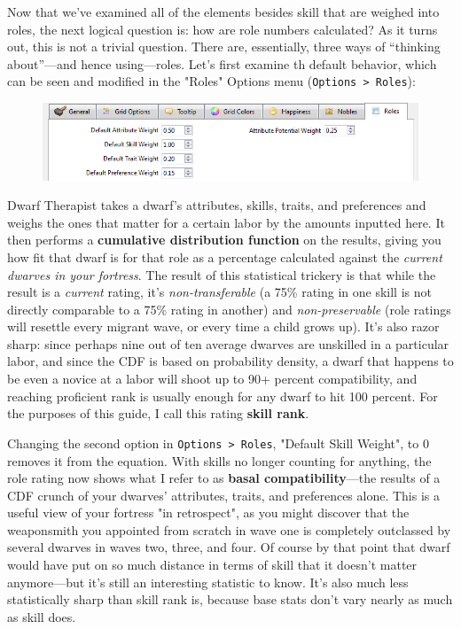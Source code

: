 \documentclass[]{article}
\begin{document}
Now that we've examined all of the elements besides skill that are weighed into roles, the next logical
question is: how are role numbers calculated? As it turns out, this is not a trivial question.
There are, essentially, three ways of ``thinking about''---and hence using---roles. Let's first examine
th default behavior, which can be seen and modified in the "Roles" Options menu (\texttt{Options >
Roles}):
\begin{figure}[h!] \centering
\vspace{-5pt}
\includegraphics[width=\linewidth]{Sec3Fig1}
\vspace{-5pt}
\end{figure}

\newpage
Dwarf Therapist takes a dwarf's attributes, skills, traits, and preferences and weighs the ones that
matter for a certain labor by the amounts inputted here. It then performs a \textbf{cumulative
distribution function} on the results, giving you how fit that dwarf is for that role as a percentage
calculated against the \emph{current dwarves in your fortress}. The result of this statistical trickery
is that while the result is a \emph{current} rating, it's \emph{non-transferable} (a 75\% rating in one
skill is not directly comparable to a 75\% rating in another) and \emph{non-preservable} (role ratings
will resettle every migrant wave, or every time a child grows up). It's also razor sharp: since perhaps
nine out of ten average dwarves are unskilled in a particular labor, and since the CDF is based on
probability density, a dwarf that happens to be even a novice at a labor will shoot up to 90+ percent
compatibility, and reaching proficient rank is usually enough for any dwarf to hit 100 percent. For the
purposes of this guide, I call this rating \textbf{skill rank}.

Changing the second option in \texttt{Options > Roles}, "Default Skill Weight", to 0 removes it from the
equation. With skills no longer counting for anything, the role rating now shows what I refer to as
\textbf{basal compatibility}---the results of a CDF crunch of your dwarves' attributes, traits, and
preferences alone. This is a useful view of your fortress "in retrospect", as you might discover that the
weaponsmith you appointed from scratch in wave one is completely outclassed by several dwarves in waves
two, three, and four. Of course by that point that dwarf would have put on so much distance in terms of
skill that it doesn't matter anymore---but it's still an interesting statistic to know. It's also much
less statistically sharp than skill rank is, because base stats don't vary nearly as much as skill does.
\end{document}
